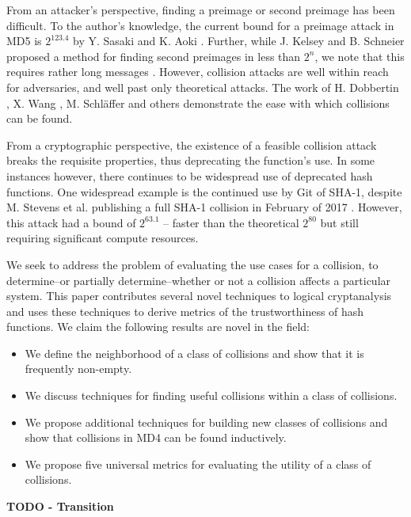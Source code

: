 \documentclass[conference]{IEEEtran}
\begin{document}
From an attacker's perspective, finding a preimage or second preimage has been
difficult. To the author's knowledge, the current bound for a preimage attack
in MD5 is $2^{123.4}$ by Y. Sasaki and K. Aoki \cite{SasakiPreimage}. Further,
while J. Kelsey and B. Schneier proposed a method for finding second preimages
in less than $2^n$, we note that this requires rather long messages
\cite{SchneierSecondPreimage}. However, collision attacks are well within reach
for adversaries, and well past only theoretical attacks. The work of
H. Dobbertin \cite{Dobbertin1998}, X. Wang \cite{cryptoeprint:2004:199},
M. Schl{\"a}ffer \cite{Schlaffer2006} and others demonstrate the ease with which
collisions can be found.

From a cryptographic perspective, the existence of a feasible collision attack
breaks the requisite properties, thus deprecating the function's use. In some
instances however, there continues to be widespread use of deprecated hash
functions. One widespread example is the continued use by Git of SHA-1, despite
M. Stevens et al. publishing a full SHA-1 collision in February of 2017
\cite{cryptoeprint:2017:190}. However, this attack had a bound of $2^{63.1}$ --
faster than the theoretical $2^{80}$ but still requiring significant compute
resources.

We seek to address the problem of evaluating the use cases for a collision,
to determine--or partially determine--whether or not a collision affects
a particular system. This paper contributes several novel techniques to
logical cryptanalysis and uses these techniques to derive metrics of the
trustworthiness of hash functions. We claim the following results are novel
in the field:
\begin{itemize}
    \item We define the neighborhood of a class of collisions and show that
        it is frequently non-empty.
    \item We discuss techniques for finding useful collisions within a
        class of collisions.
    \item We propose additional techniques for building new classes of
        collisions and show that collisions in MD4 can be found inductively.
    \item We propose five universal metrics for evaluating the utility of
        a class of collisions.
\end{itemize}




\textbf{TODO - Transition}
\end{document}
